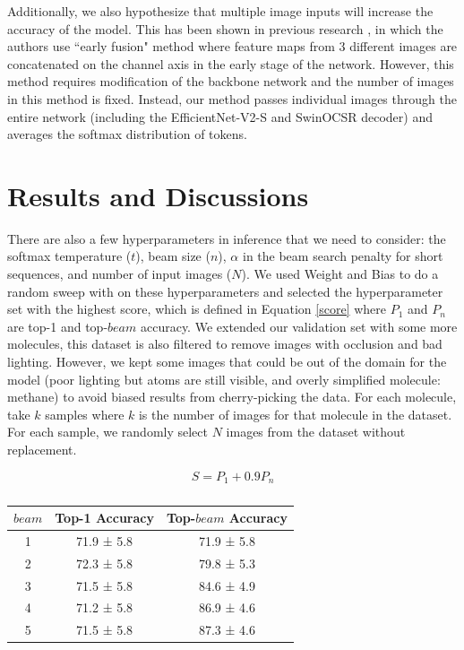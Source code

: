 \documentclass{article}
\begin{document}
Additionally, we also hypothesize that multiple image inputs will increase the accuracy of the model. This has been shown in previous research \autocite{sun_multi-input_2017}, in which the authors use ``early fusion" method where feature maps from 3 different images are concatenated on the channel axis in the early stage of the network. However, this method requires modification of the backbone network and the number of images in this method is fixed. Instead, our method passes individual images through the entire network (including the EfficientNet-V2-S and SwinOCSR decoder) and averages the softmax distribution of tokens.  

\section{Results and Discussions} 
There are also a few hyperparameters in inference that we need to consider: the softmax temperature ($t$), beam size ($n$), $\alpha$ in the beam search penalty for short sequences, and number of input images ($N$). We used Weight and Bias \cite{wandb} to do a random sweep with on these hyperparameters and selected the hyperparameter set with the highest score, which is defined in Equation \ref{score} where $P_{1}$ and $P_{n}$ are top-1 and top-$beam$ accuracy. We extended our validation set with some more molecules, this dataset is also filtered to remove images with occlusion and bad lighting. However, we kept some images that could be out of the domain for the model (poor lighting but atoms are still visible, and overly simplified molecule: methane) to avoid biased results from cherry-picking the data. For each molecule, take $k$ samples where $k$ is the number of images for that molecule in the dataset. For each sample, we randomly select $N$ images from the dataset without replacement. 


\begin{equation}
S = P_{1} + 0.9P_{n}
\label{score}
\end{equation}

\begin{table}[]
    \centering
    \begin{tabular}{c|cc}
      $beam$ & Top-1 Accuracy & Top-$beam$ Accuracy \\ \hline
      1 & 71.9 ± 5.8 & 71.9 ± 5.8 \\ 2 & 72.3 ± 5.8 & 79.8 ± 5.3 \\ 3 & 71.5 ± 5.8 & 84.6 ± 4.9 \\ 4 & 71.2 ± 5.8 & 86.9 ± 4.6 \\ 5 & 71.5 ± 5.8 & 87.3 ± 4.6
    \end{tabular}
    \caption{}
    \label{tab:my_label}
\end{table}
\end{document}
